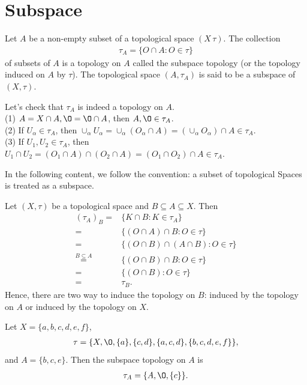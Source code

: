 \section{Subspace}
\begin{definition}{}{}
    Let $A$ be a non-empty subset of a topological space $(X\,\tau)$. 
    The collection 
    \begin{align*}
        \tau_{A}=\{O\cap A: O\in \tau\}
    \end{align*}
    of subsets of $A$ is a topology on $A$ called the subspace topology
    (or the topology induced on $A$ by $\tau$). The topological space $(A,\tau_A)$ is said to be a subspace of $(X,\tau)$.
\end{definition}
Let's check that $\tau_A$ is indeed a topology on $A$.\\
(1) $A=X\cap A, \O = \O\cap A$, then $A,\O\in \tau_A$.\\
(2) If $U_{\alpha}\in \tau_A$, then $\cup_{\alpha}{U_\alpha} = \cup_{\alpha} (O_{\alpha}\cap A)=(\cup_{\alpha} O_{\alpha})\cap A\in\tau_A$.\\
(3) If $U_1,U_2\in\tau_A$, then $U_1\cap U_2 = (O_1\cap A)\cap (O_2\cap A)=(O_1\cap O_2)\cap A\in \tau_A$.

In the following content,  we follow the convention: a subset of topological Spaces is treated as a subspace. 
\par
Let $(X,\tau)$ be a topological space and $B\subseteq A\subseteq X$. Then
\begin{align*}
    (\tau_A)_B = & \{K\cap B:K\in \tau_A\} \\
        =  &\{(O\cap A)\cap B: O\in\tau\} \\
        =  &\{(O\cap B)\cap (A\cap B): O\in \tau\}\\
        \overset{B\subseteq A}{=}  &\{(O\cap B)\cap B: O\in \tau\}\\
        =  &\{(O\cap B): O\in \tau\}\\
        =  &\tau_B.
\end{align*}
Hence, there are two way to induce the topology on $B$: induced by the topology on $A$ or
induced by the topology on $X$.

\begin{example}{}{}
    Let $X=\{a,b,c,d,e,f\}$, 
    \begin{align*}
        \tau = \{X,\O, \{a\}, \{c,d\}, \{a,c,d\}, \{b,c,d,e,f\}\},
    \end{align*}
    and $A=\{b,c,e\}$. Then the subspace topology on $A$ is 
    \begin{align*}
        \tau_A = \{A,\O, \{c\}\}.
    \end{align*}
\end{example}


